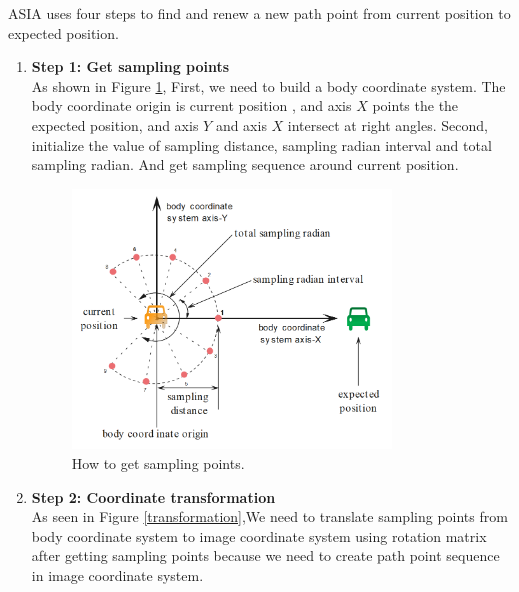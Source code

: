 ASIA uses four steps to find and renew a new path point from current position to expected position.

\begin{enumerate}
    \item \textbf{Step 1: Get sampling points}\\
    As shown in Figure \ref{samplings}, First, we need to build a body coordinate system. The body coordinate origin is current position , and axis $X$ points the the expected position, and axis $Y$ and axis $X$ intersect at right angles. Second, initialize the value of sampling distance, sampling radian interval and total sampling radian. And get sampling sequence around current position.
    
    \begin{figure}[thb]
        \centering
        \includegraphics[width=0.8\textwidth]{images/PathPlaningSampling.png}
        \caption[How to find the path point]{How to get sampling points.}\label{samplings}
    \end{figure}
    
    \item \textbf{Step 2: Coordinate transformation}\\
    As seen in Figure \ref{transformation},We need to translate sampling points from body coordinate system to image coordinate system using rotation matrix after getting sampling points because we need to create path point sequence in image coordinate system.
    

\end{enumerate}
